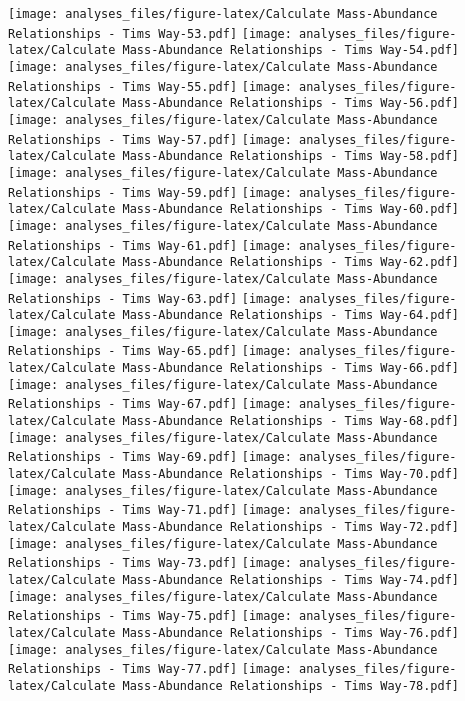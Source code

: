 \documentclass[]{article}
\begin{document}
\texttt{[image: analyses\_files/figure-latex/Calculate Mass-Abundance Relationships - Tims Way-53.pdf]}
\texttt{[image: analyses\_files/figure-latex/Calculate Mass-Abundance Relationships - Tims Way-54.pdf]}
\texttt{[image: analyses\_files/figure-latex/Calculate Mass-Abundance Relationships - Tims Way-55.pdf]}
\texttt{[image: analyses\_files/figure-latex/Calculate Mass-Abundance Relationships - Tims Way-56.pdf]}
\texttt{[image: analyses\_files/figure-latex/Calculate Mass-Abundance Relationships - Tims Way-57.pdf]}
\texttt{[image: analyses\_files/figure-latex/Calculate Mass-Abundance Relationships - Tims Way-58.pdf]}
\texttt{[image: analyses\_files/figure-latex/Calculate Mass-Abundance Relationships - Tims Way-59.pdf]}
\texttt{[image: analyses\_files/figure-latex/Calculate Mass-Abundance Relationships - Tims Way-60.pdf]}
\texttt{[image: analyses\_files/figure-latex/Calculate Mass-Abundance Relationships - Tims Way-61.pdf]}
\texttt{[image: analyses\_files/figure-latex/Calculate Mass-Abundance Relationships - Tims Way-62.pdf]}
\texttt{[image: analyses\_files/figure-latex/Calculate Mass-Abundance Relationships - Tims Way-63.pdf]}
\texttt{[image: analyses\_files/figure-latex/Calculate Mass-Abundance Relationships - Tims Way-64.pdf]}
\texttt{[image: analyses\_files/figure-latex/Calculate Mass-Abundance Relationships - Tims Way-65.pdf]}
\texttt{[image: analyses\_files/figure-latex/Calculate Mass-Abundance Relationships - Tims Way-66.pdf]}
\texttt{[image: analyses\_files/figure-latex/Calculate Mass-Abundance Relationships - Tims Way-67.pdf]}
\texttt{[image: analyses\_files/figure-latex/Calculate Mass-Abundance Relationships - Tims Way-68.pdf]}
\texttt{[image: analyses\_files/figure-latex/Calculate Mass-Abundance Relationships - Tims Way-69.pdf]}
\texttt{[image: analyses\_files/figure-latex/Calculate Mass-Abundance Relationships - Tims Way-70.pdf]}
\texttt{[image: analyses\_files/figure-latex/Calculate Mass-Abundance Relationships - Tims Way-71.pdf]}
\texttt{[image: analyses\_files/figure-latex/Calculate Mass-Abundance Relationships - Tims Way-72.pdf]}
\texttt{[image: analyses\_files/figure-latex/Calculate Mass-Abundance Relationships - Tims Way-73.pdf]}
\texttt{[image: analyses\_files/figure-latex/Calculate Mass-Abundance Relationships - Tims Way-74.pdf]}
\texttt{[image: analyses\_files/figure-latex/Calculate Mass-Abundance Relationships - Tims Way-75.pdf]}
\texttt{[image: analyses\_files/figure-latex/Calculate Mass-Abundance Relationships - Tims Way-76.pdf]}
\texttt{[image: analyses\_files/figure-latex/Calculate Mass-Abundance Relationships - Tims Way-77.pdf]}
\texttt{[image: analyses\_files/figure-latex/Calculate Mass-Abundance Relationships - Tims Way-78.pdf]}
\end{document}
